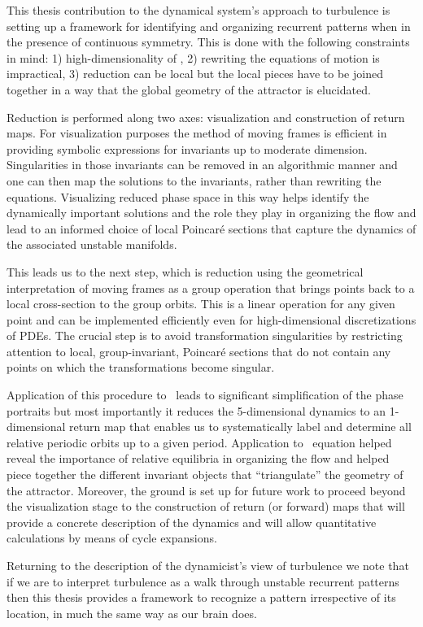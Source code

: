 
This thesis contribution to the dynamical system's approach to
turbulence is setting up a framework for identifying and
organizing recurrent patterns when in the presence of continuous
symmetry. This is done with the following
constraints in mind: 1) high-dimensionality of \statesp, 2)
rewriting the equations of motion is impractical, 3) reduction
can be local but the local pieces have to be joined together in
a way that the global geometry of the attractor is elucidated.

Reduction is performed along two axes: visualization and construction of return maps.
For visualization purposes the method of moving frames is efficient in providing
symbolic expressions for invariants up to moderate dimension. Singularities
in those invariants can be removed in an algorithmic manner and one can then map the
solutions to the invariants, rather than rewriting the equations. Visualizing
reduced phase space in this way helps identify the dynamically important solutions and the role they
play in organizing the flow and lead to an informed choice of local Poincar\'e sections
that capture the dynamics of the associated unstable manifolds.

This leads us to the next step, which is reduction using the geometrical interpretation
of moving frames as a group operation that brings points back to a local cross-section to the
group orbits. This is a linear operation for any given point and can be implemented efficiently
even for high-dimensional discretizations of PDEs. The crucial step is to avoid transformation
singularities by restricting attention to local, group-invariant, Poincar\'e sections that
do not contain any points on which the transformations become singular.

Application of this procedure to \CLe\ leads to significant simplification of the phase portraits
but most importantly it reduces the 5-dimensional dynamics to an 1-dimensional return map that enables us to systematically label and determine all relative periodic orbits up to a given period. Application
to \KS\ equation helped reveal the importance of relative equilibria in organizing the flow and helped piece together the different invariant objects that ``triangulate'' the geometry of the attractor.
Moreover, the ground is set up for future work to proceed beyond the visualization stage to the construction of return (or forward) maps that will provide a concrete description of the dynamics
and will allow quantitative calculations by means of cycle expansions.

Returning to the description of the dynamicist's view of turbulence we note that if we are to
interpret turbulence as a walk through unstable recurrent patterns then this thesis provides
a framework to recognize a pattern irrespective of its location, in much the same way as our brain
does.
